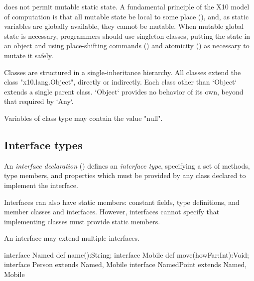 \Xten{} does not permit mutable static state. A fundamental principle of the
X10 model of computation is that all mutable state be local to some place
(), and, as static variables are globally available, they
cannot be mutable. When mutable global state is necessary, programmers should
use singleton classes, putting the state in an object and using place-shifting
commands () and atomicity () as necessary
to mutate it safely.


Classes are structured in a single-inheritance hierarchy. All classes extend
the class \xcd"x10.lang.Object", directly or indirectly. Each class other than
\xcd`Object` extends a single parent class.  \xcd`Object` provides no behavior
of its own, beyond that required by \xcd`Any`.



Variables of class type may contain the value \xcd"null". 

\subsection{Interface types}
\label{InterfaceTypes}


An {\em interface declaration} () defines an {\em
interface type}, specifying a set of methods, type members, and
properties which must be provided by any class declared to implement the
interface. 


Interfaces can also have static members: constant fields, type definitions,
and member classes and interfaces.  However, interfaces cannot specify that
implementing classes must provide static members.

An interface may extend multiple interfaces.  
\begin{xten}
interface Named {
  def name():String;
}
interface Mobile {
  def move(howFar:Int):Void;
}
interface Person extends Named, Mobile {}
interface NamedPoint extends Named, Mobile{} 
\end{xten}
%


